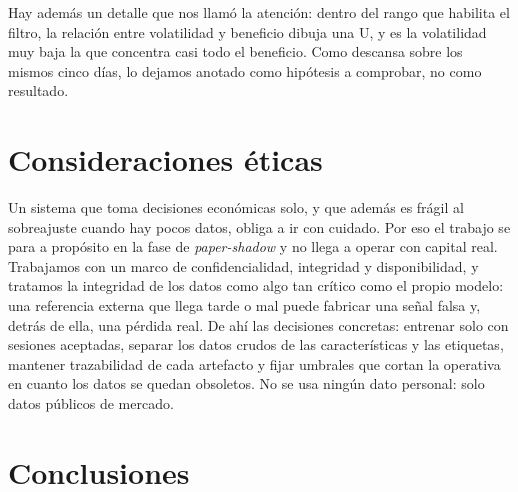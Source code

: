 \documentclass[11pt,a4paper]{article}
\begin{document}
Hay además un detalle que nos llamó la atención: dentro del rango que habilita el
filtro, la relación entre volatilidad y beneficio dibuja una U, y es la volatilidad
muy baja la que concentra casi todo el beneficio. Como descansa sobre los mismos
cinco días, lo dejamos anotado como hipótesis a comprobar, no como resultado.

\section{Consideraciones éticas}

Un sistema que toma decisiones económicas solo, y que además es frágil al
sobreajuste cuando hay pocos datos, obliga a ir con cuidado. Por eso el trabajo se
para a propósito en la fase de \emph{paper-shadow} y no llega a operar con capital
real. Trabajamos con un marco de confidencialidad, integridad y disponibilidad, y
tratamos la integridad de los datos como algo tan crítico como el propio modelo: una
referencia externa que llega tarde o mal puede fabricar una señal falsa y, detrás de
ella, una pérdida real. De ahí las decisiones concretas: entrenar solo con sesiones
aceptadas, separar los datos crudos de las características y las etiquetas, mantener
trazabilidad de cada artefacto y fijar umbrales que cortan la operativa en cuanto los
datos se quedan obsoletos. No se usa ningún dato personal: solo datos públicos de
mercado.

\section{Conclusiones}
\end{document}
